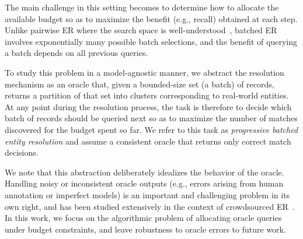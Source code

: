 \documentclass[sigconf, nonacm]{acmart}
\begin{document}


The main challenge in this setting becomes to determine how to allocate the available budget so as to maximize the benefit (e.g., recall) obtained at each step.
Unlike pairwise ER where the search space is well-understood~\cite{papadakis_exploration}, batched ER involves exponentially many possible batch selections, and the benefit of querying a batch depends on all previous queries.

To study this problem in a model-agnostic manner, we abstract the resolution mechanism as an oracle that, given a bounded-size set (a batch) of records, returns a partition of that set into clusters corresponding to real-world entities.
At any point during the resolution process, the task is therefore to decide which batch of records should be queried next so as to maximize the number of matches discovered for the budget spent so far.
We refer to this task as \emph{progressive batched entity resolution} and assume a consistent oracle that returns only correct match decisions.

We note that this abstraction deliberately idealizes the behavior of the oracle.
Handling noisy or inconsistent oracle outputs (e.g., errors arising from human annotation or imperfect models) is an important and challenging problem in its own right, and has been studied extensively in the context of crowdsourced ER~\cite{crowd_error_01,crowd_error_02,crowd_error_03,crowd_error_04}.
In this work, we focus on the algorithmic problem of allocating oracle queries under budget constraints, and leave robustness to oracle errors to future work.



\end{document}
